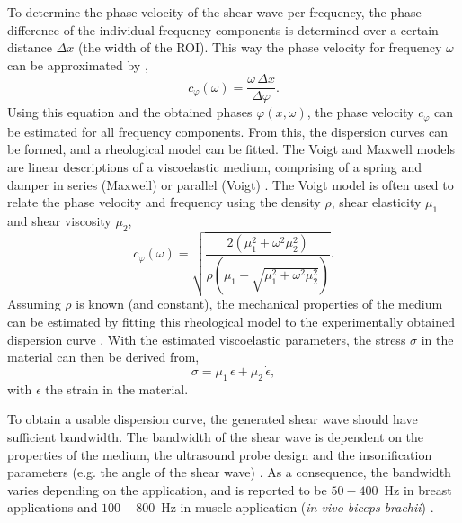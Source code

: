 To determine the phase velocity of the shear wave per frequency, the phase difference of the individual frequency components is determined over a certain distance $\Delta x$ (the width of the ROI). This way the phase velocity for frequency $\omega$ can be approximated by \cite{chen_quantifying_2004},
\begin{equation}
    c_{\varphi}(\omega) = \frac{\omega \, \Delta x}{\Delta \varphi}.
\end{equation}
Using this equation and the obtained phases $\varphi(x,\omega)$, the phase velocity $c_{\varphi}$ can be estimated for all frequency components. From this, the dispersion curves can be formed, and a rheological model can be fitted. The Voigt and Maxwell models are linear descriptions of a viscoelastic medium, comprising of a spring and damper in series (Maxwell) or parallel (Voigt) \cite{chen_quantifying_2004}. The Voigt model is often used to relate the phase velocity and frequency using the density $\rho$, shear elasticity $\mu_1$ and shear viscosity $\mu_2$,
\begin{equation}
    c_{\varphi}(\omega) = \sqrt{\frac{2\left( \mu_1^2+\omega^2 \mu_2^2\right)}{\rho \left( \mu_1 + \sqrt{\mu_1^2 + \omega^2 \mu_2^2} \right)}}.
\end{equation}
Assuming $\rho$ is known (and constant), the mechanical properties of the medium can be estimated by fitting this rheological model to the experimentally obtained dispersion curve \cite{deffieux_shear_2009}. With the estimated viscoelastic parameters, the stress $\sigma$ in the material can then be derived from,
\begin{equation}
	\sigma = \mu_1 \, \epsilon + \mu_2 \, \dot\epsilon,
\end{equation}
with $\epsilon$ the strain in the material. 

To obtain a usable dispersion curve, the generated shear wave should have sufficient bandwidth. The bandwidth of the shear wave is dependent on the properties of the medium, the ultrasound probe design and the insonification parameters (e.g. the angle of the shear wave) \cite{nguyen_assessment_2011}. As a consequence, the bandwidth varies depending on the application, and is reported to be $50-400$~\si{\hertz} in breast applications  \cite{nguyen_assessment_2011} and $100-800$~\si{\hertz} in muscle application (\textit{in vivo biceps brachii}) \cite{gennisson_viscoelastic_2010}.










